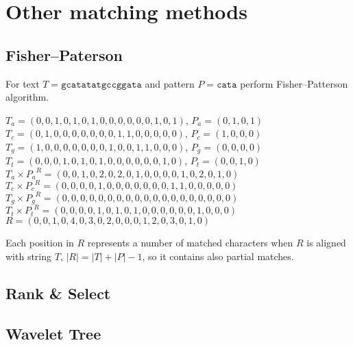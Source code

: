 \chapter{Other matching methods}

\section{Fisher--Paterson}

For text $T=\texttt{gcatatatgccggata}$ and pattern $P=\texttt{cata}$ perform Fisher--Patterson algorithm.

$T_a=(0,0,1,0,1,0,1,0,0,0,0,0,0,1,0,1)$, $P_a=(0,1,0,1)$\\
$T_c=(0,1,0,0,0,0,0,0,0,1,1,0,0,0,0,0)$, $P_c=(1,0,0,0)$\\
$T_g=(1,0,0,0,0,0,0,0,1,0,0,1,1,0,0,0)$, $P_g=(0,0,0,0)$\\
$T_t=(0,0,0,1,0,1,0,1,0,0,0,0,0,0,1,0)$, $P_t=(0,0,1,0)$\medskip\\
$T_a \times {P_a}^R = (0,0,1,0,2,0,2,0,1,0,0,0,0,1,0,2,0,1,0)$\\
$T_c \times {P_c}^R = (0,0,0,0,1,0,0,0,0,0,0,0,1,1,0,0,0,0,0)$\\
$T_g \times {P_g}^R = (0,0,0,0,0,0,0,0,0,0,0,0,0,0,0,0,0,0,0)$\\
$T_t \times {P_t}^R = (0,0,0,0,1,0,1,0,1,0,0,0,0,0,0,1,0,0,0)$\medskip\\
$R = (0,0,1,0,4,0,3,0,2,0,0,0,1,2,0,3,0,1,0)$

Each position in $R$ represents a number of matched characters when $R$ is aligned with string $T$, $|R| = |T|+ |P| - 1$, so it contains also partial matches.

\section{Rank \& Select}

\clearpage
\section{Wavelet Tree}

